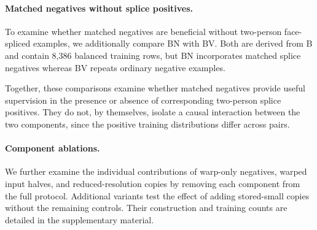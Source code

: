 \paragraph{Matched negatives without splice positives.}
To examine whether matched negatives are beneficial
without two-person face-spliced examples, we additionally
compare BN with BV. Both are derived from B and contain
8,386 balanced training rows, but BN incorporates
matched splice negatives whereas BV repeats ordinary
negative examples.

Together, these comparisons examine whether matched
negatives provide useful supervision in the presence
or absence of corresponding two-person splice positives.
They do not, by themselves, isolate a causal interaction
between the two components, since the positive training
distributions differ across pairs.

\paragraph{Component ablations.}
We further examine the individual contributions of
warp-only negatives, warped input halves, and
reduced-resolution copies by removing each component
from the full protocol. Additional variants test the
effect of adding stored-small copies without the
remaining controls. Their construction and training
counts are detailed in the supplementary material.
